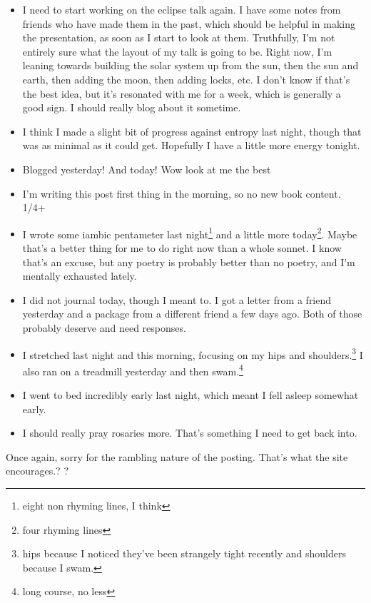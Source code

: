 \documentclass[12pt]{article}[titlepage]
\newcommand{\1}{\={a}}
\newcommand{\2}{\={e}}
\newcommand{\3}{\={\i}}
\newcommand{\4}{\=o}
\newcommand{\5}{\=u}
\newcommand{\6}{\={A}}
\renewcommand{\,}{\textsuperscript{,}}
\begin{document}
\begin{itemize}
\item I need to start working on the eclipse talk again. I have some notes from friends who have made them in the past, which should be helpful in making the presentation, as soon as I start to look at them. Truthfully, I'm not entirely sure what the layout of my talk is going to be. Right now, I'm leaning towards building the solar system up from the sun, then the sun and earth, then adding the moon, then adding locks, etc.
I don't know if that's the best idea, but it's resonated with me for a week, which is generally a good sign. I should really blog about it sometime.
\item I think I made a slight bit of progress against entropy last night, though that was as minimal as it could get. Hopefully I have a little more energy tonight.
\item Blogged yesterday! And today! Wow look at me the best
\item I'm writing this post first thing in the morning, so no new book content. 1/4+
\item I wrote some iambic pentameter last night\footnote{eight non rhyming lines, I think} and a little more today\footnote{four rhyming lines}. Maybe that's a better thing for me to do right now than a whole sonnet.
I know that's an excuse, but any poetry is probably better than no poetry, and I'm mentally exhausted lately.
\item I did not journal today, though I meant to. I got a letter from a friend yesterday and a package from a different friend a few days ago. Both of those probably deserve and need responses.
\item I stretched last night and this morning, focusing on my hips and shoulders.\footnote{hips because I noticed they've been strangely tight recently and shoulders because I swam.} I also ran on a treadmill yesterday and then swam.\footnote{long course, no less}
\item I went to bed incredibly early last night, which meant I fell asleep somewhat early.
\item I should really pray rosaries more. That's something I need to get back into.
\end{itemize}
Once again, sorry for the rambling nature of the posting. That's what the site encourages.?
?
\end{document}
